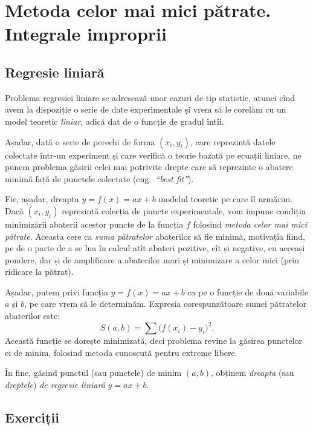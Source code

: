\chapter{Metoda celor mai mici pătrate. Integrale improprii}


\section{Regresie liniară}
Problema regresiei liniare se adresează unor cazuri de tip statistic, atunci
cînd avem la dispoziție o serie de date experimentale și vrem să le corelăm
cu un model teoretic \emph{liniar}, adică dat de o funcție de gradul întîi.

Așadar, dată o serie de perechi de forma $ (x_i, y_i) $, care reprezintă
datele colectate într-un experiment și care verifică o teorie bazată pe
ecuații liniare, ne punem problema găsirii celei mai potrivite drepte care
să reprezinte o abatere minimă față de punctele colectate (eng.\ \emph{``best fit''}).

Fie, așadar, dreapta $ y = f(x) = ax + b$ modelul teoretic pe care îl urmărim.
Dacă $ (x_i, y_i) $ reprezintă colecția de puncte experimentale, vom impune
condiția minimizării abaterii acestor puncte de la funcția $ f $ folosind
\emph{metoda celor mai mici pătrate}. Aceasta cere ca \emph{suma pătratelor}
abaterilor să fie minimă, motivația fiind, pe de o parte de a se lua în calcul
atît abateri pozitive, cît și negative, cu aceeași pondere, dar și de
amplificare a abaterilor mari și minimizare a celor mici (prin ridicare la
pătrat).

Așadar, putem privi funcția $ y = f(x) = ax + b $ ca pe o funcție de două variabile
$ a $ și $ b $, pe care vrem să le determinăm. Expresia corespunzătoare
sumei pătratelor abaterilor este:
\[
  S(a, b) = \sum \big( f(x_i) - y_i \big)^2.
\]
Această funcție se dorește minimizată, deci problema revine la găsirea punctelor
ei de minim, folosind metoda cunoscută pentru extreme libere.

În fine, găsind punctul (sau punctele) de minim $ (a, b) $, obținem
\emph{dreapta} (sau \emph{dreptele}) \emph{de regresie liniară} $ y = ax + b $.


\section{Exerciții}

